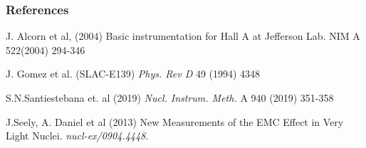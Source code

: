 \documentclass{beamer}
\begin{document}
\begin{frame}[allowframebreaks]
\frametitle{References}
\footnotesize{
	\begin{thebibliography}{10} %
		\vspace*{-20pt}
		 J. Alcorn et al, (2004)
		\newblock Basic instrumentation for Hall A at Jefferson Lab. NIM A 522(2004) 294-346
	
%
		
		 J. Gomez et al. (SLAC-E139)  
		\newblock \emph{Phys. Rev D}  49 (1994) 4348 


		 S.N.Santiestebana et. al (2019)
		\newblock 	\emph{Nucl. Instrum. Meth.} A 940 (2019) 351-358
				
		 J.Seely, A. Daniel et al (2013) 
		\newblock New Measurements of the EMC Effect in Very Light Nuclei. \emph{nucl-ex/0904.4448}.
		
				
	\end{thebibliography}
}
\end{frame}
\end{document}
